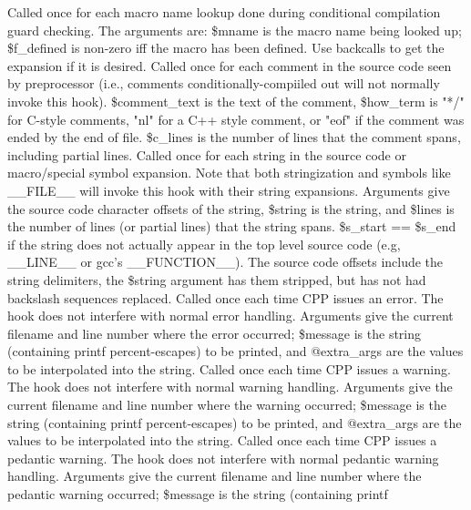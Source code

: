 Called once for each macro name lookup done during conditional compilation
guard checking.  The arguments are:
\$mname is the macro name being looked up; \$f\_\-defined is non-zero
iff the macro has been defined.  Use backcalls to get the expansion if
it is desired.
Called once for each comment in the source code seen by preprocessor (i.e.,
comments conditionally-compiiled out will not normally invoke this hook).
\$comment\_\-text is the text of the comment, \$how\_\-term is "*/" for C-style
comments, "nl" for a C++ style comment, or "eof" if the comment
was ended by the end of file.
\$c\_\-lines is the number of lines that the comment spans, including partial lines.
Called once for each string in the source code or macro/special symbol expansion.
Note that both stringization and symbols like \_\-\_\-FILE\_\-\_\- will invoke this hook
with their string expansions.
Arguments give the source code character offsets of the string, \$string is
the string, and \$lines is the number of lines (or partial lines) that the
string spans.  \$s\_\-start == \$s\_\-end if the string does not actually appear
in the top level source code (e.g, \_\-\_\-LINE\_\-\_\- or gcc's \_\-\_\-FUNCTION\_\-\_\-).
The source code offsets include the string delimiters, the \$string argument
has them stripped, but has not had backslash sequences replaced.
Called once each time CPP issues an error.  The hook does not interfere
with normal error handling.  Arguments give the current filename and line
number where the error occurred;  \$message is the string (containing printf
percent-escapes) to be printed, and @extra\_\-args are the values to be 
interpolated into the string.
Called once each time CPP issues a warning.  The hook does not interfere
with normal warning handling.  Arguments give the current filename and line
number where the warning occurred;  \$message is the string (containing printf
percent-escapes) to be printed, and @extra\_\-args are the values to be 
interpolated into the string.
Called once each time CPP issues a pedantic warning.  The hook does not interfere
with normal pedantic warning handling.  Arguments give the current filename and line
number where the pedantic warning occurred;  \$message is the string (containing printf
